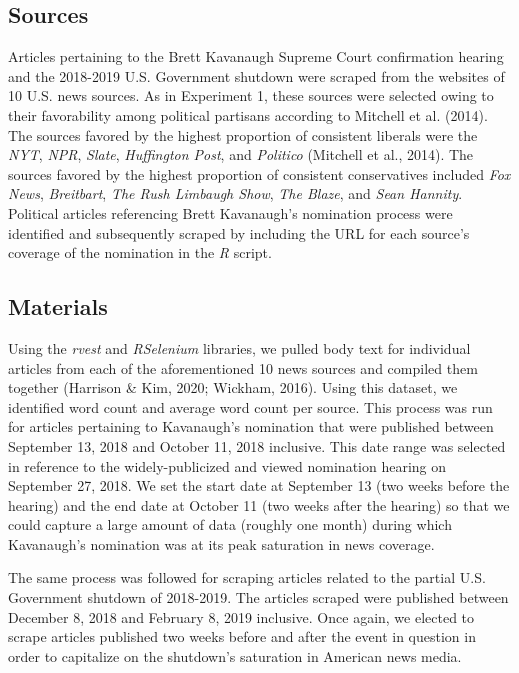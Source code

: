 \documentclass[
  english,
  man,floatsintext]{apa6}
\begin{document}
\hypertarget{sources-1}{%
\subsection{Sources}\label{sources-1}}

Articles pertaining to the Brett Kavanaugh Supreme Court confirmation hearing and the 2018-2019 U.S. Government shutdown were scraped from the websites of 10 U.S. news sources. As in Experiment 1, these sources were selected owing to their favorability among political partisans according to Mitchell et al. (2014). The sources favored by the highest proportion of consistent liberals were the \emph{NYT}, \emph{NPR}, \emph{Slate}, \emph{Huffington Post}, and \emph{Politico} (Mitchell et al., 2014). The sources favored by the highest proportion of consistent conservatives included \emph{Fox News}, \emph{Breitbart}, \emph{The Rush Limbaugh Show}, \emph{The Blaze}, and \emph{Sean Hannity}. Political articles referencing Brett Kavanaugh's nomination process were identified and subsequently scraped by including the URL for each source's coverage of the nomination in the \emph{R} script.

\hypertarget{materials-1}{%
\subsection{Materials}\label{materials-1}}

Using the \emph{rvest} and \emph{RSelenium} libraries, we pulled body text for individual articles from each of the aforementioned 10 news sources and compiled them together (Harrison \& Kim, 2020; Wickham, 2016). Using this dataset, we identified word count and average word count per source. This process was run for articles pertaining to Kavanaugh's nomination that were published between September 13, 2018 and October 11, 2018 inclusive. This date range was selected in reference to the widely-publicized and viewed nomination hearing on September 27, 2018. We set the start date at September 13 (two weeks before the hearing) and the end date at October 11 (two weeks after the hearing) so that we could capture a large amount of data (roughly one month) during which Kavanaugh's nomination was at its peak saturation in news coverage.

The same process was followed for scraping articles related to the partial U.S. Government shutdown of 2018-2019. The articles scraped were published between December 8, 2018 and February 8, 2019 inclusive. Once again, we elected to scrape articles published two weeks before and after the event in question in order to capitalize on the shutdown's saturation in American news media.
\end{document}
